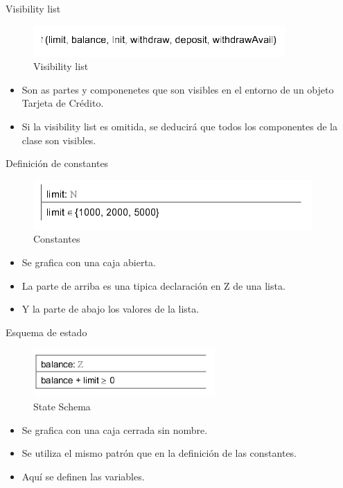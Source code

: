 \documentclass{beamer}
\begin{document}
\begin{frame}{Visibility list}
  \begin{figure}
      \centering
      \includegraphics[scale=0.5]{Z2.png}
      \caption{Visibility list}
      \label{Visibility List}
  \end{figure}
  \begin{itemize}
      \item Son as partes y componenetes que son visibles en el entorno de un objeto Tarjeta de Crédito.
      \item Si la visibility list es omitida, se deducirá que todos los componentes de la clase son visibles.
  \end{itemize}
\end{frame}

\begin{frame}{Definición de constantes}
  \begin{figure}
      \centering
      \includegraphics[scale=0.5]{Z3.png}
      \caption{Constantes}
      \label{Constantes}
  \end{figure}
  \begin{itemize}
   \item Se grafica con una caja abierta.
   \item La parte de arriba es una tipica declaración en Z de una lista.
   \item Y la parte de abajo los valores de la lista.
  \end{itemize}
\end{frame}

\begin{frame}{Esquema de estado}
  \begin{figure}
      \centering
      \includegraphics[scale=0.5]{Z4.png}
      \caption{State Schema}
      \label{Esquema de estado}
  \end{figure}
  \begin{itemize}
   \item Se grafica con una caja cerrada sin nombre.
   \item Se utiliza el mismo patrón que en la definición de las constantes.
   \item Aquí se definen las variables.
  \end{itemize}
\end{frame}
\end{document}
